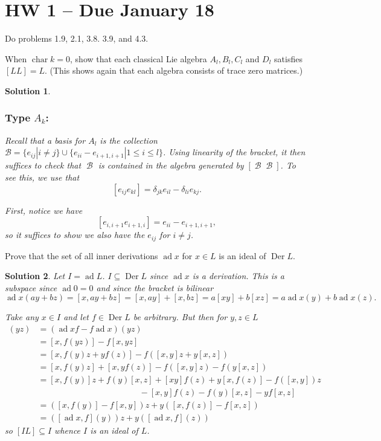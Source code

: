 \documentclass[12pt]{article}
\newenvironment{hwprob}[1]
{\renewcommand{\theprob}{#1}%
 \addtocounter{thm}{-1}%
 \begin{prob}}
{\end{prob}}
\theoremstyle{nonumberbreak}
\newtheorem{sol}{Solution}
\theoremstyle{changebreak}
\theoremstyle{nonumberbreak}
\theoremstyle{change}
\DeclareMathOperator{\ch}{char}
\DeclareMathOperator{\calB}{\mathcal{B}}
\DeclareMathOperator{\ad}{ad}
\DeclareMathOperator{\Der}{Der}
\begin{document}
\newpage

\section*{HW 1 -- Due January 18}
Do problems 1.9, 2.1, 3.8. 3.9, and 4.3.

\begin{hwprob}{1.9}
	When $\ch k=0$, show that each classical Lie algebra $A_l,B_l, C_l$ and $D_l$ satisfies $[LL]=L$. (This shows again that each algebra consists of trace zero matrices.)
\end{hwprob}
\begin{sol}
	\subsubsection*{Type $A_k$:}
	Recall that a basis for $A_l$ is the collection $\mathcal{B}=\{e_{ij}|i\ne j\}\cup\{e_{ii}-e_{i+1,i+1}|1\le i\le l\}$. Using linearity of the bracket,
	it then suffices to check that $\calB$ is contained in the algebra generated by $[\calB \calB]$. To see this, we use that
	\[[e_{ij}e_{kl}]=\delta_{jk}e_{il}-\delta_{li}e_{kj}.\]

	First, notice we have
	\[[e_{i,i+1}e_{i+1,i}]=e_{ii}-e_{i+1,i+1},\]
	so it suffices to show we also have the $e_{ij}$ for $i\ne j$.

\end{sol}

\begin{hwprob}{2.1}
	Prove that the set of all inner derivations $\ad x$ for $x\in L$ is an ideal of $\Der L$.
\end{hwprob}
\begin{sol}
	Let $I=\ad L$. $I\subseteq \Der L$ since $\ad x$ is a derivation. This is a subspace since $\ad 0=0$ and since the bracket is bilinear
	\[\ad x(ay+bz)=[x,ay+bz]=[x,ay]+[x,bz]=a[xy]+b[xz]=a\ad x(y)+b\ad x(z).\]

	Take any $x\in I$ and let $f\in\Der L$ be arbitrary. But then for $y,z\in L$
	\begin{align*}
		[\ad x,f](yz)&=(\ad x f-f\ad x)(yz)\\
		&=[x,f(yz)]-f[x,yz]\\
		&=[x,f(y)z+yf(z)]-f([x,y]z+y[x,z])\\
		&=[x,f(y)z]+[x,yf(z)]-f([x,y]z)-f(y[x,z])\\
		&=[x,f(y)]z+f(y)[x,z]+[xy]f(z)+y[x,f(z)]-f([x,y])z\\
		&\hspace{2in} -[x,y]f(z)-f(y)[x,z]-yf[x,z]\\
		&=([x,f(y)]-f[x,y])z+y([x,f(z)]-f[x,z])\\
		&=([\ad x, f](y))z+y([\ad x,f](z))
	\end{align*}
	so $[IL]\subseteq I$ whence $I$ is an ideal of $L$.
\end{sol}
\end{document}
